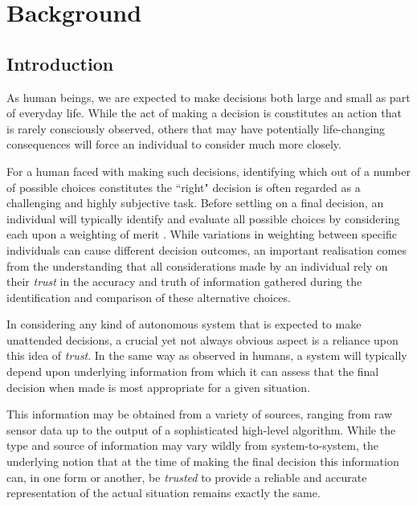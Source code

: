 \section{Background}

\subsection{Introduction}

As human beings, we are expected to make decisions both large and small as part of everyday life. While the act of making a decision is constitutes an action that is rarely consciously observed, others that may have potentially life-changing consequences will force an individual to consider much more closely.

For a human faced with making such decisions, identifying which out of a number of possible choices constitutes the ``right" decision is often regarded as a challenging and highly subjective task. %
Before settling on a final decision, an individual will typically identify and evaluate all possible choices by considering each upon a weighting of merit \cite{rational-decision-model}. While variations in weighting between specific individuals can cause different decision outcomes, an important realisation comes from the understanding that all considerations made by an individual rely on their \textit{trust} in the accuracy and truth of information gathered during the identification and comparison of these alternative choices.

 In considering any kind of autonomous system that is expected to make unattended decisions, a crucial yet not always obvious aspect is a reliance upon this idea of \textit{trust}. In the same way as observed in humans, a system will typically depend upon underlying information from which it can assess that the final decision when made is most appropriate for a given situation.
 
 This information may be obtained from a variety of sources, ranging from raw sensor data up to the output of a sophisticated high-level algorithm. While the type and source of information may vary wildly from system-to-system, the underlying notion that at the time of making the final decision this information can, in one form or another, be \textit{trusted} to provide a reliable and accurate representation of the actual situation remains exactly the same. 
 
